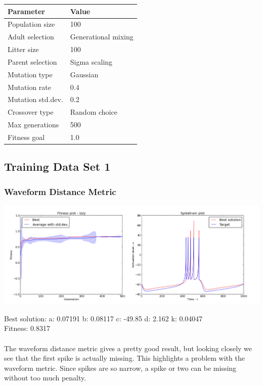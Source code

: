 \documentclass[a4paper,12pt]{article}
\begin{document}
\begin{tabular}{ll}
\hline
Parameter & Value \\
\hline \hline
Population size & 100 \\
Adult selection & Generational mixing \\
Litter size & 100 \\
Parent selection & Sigma scaling \\
Mutation type & Gaussian \\
Mutation rate & 0.4 \\
Mutation std.dev. & 0.2 \\
Crossover type & Random choice \\
Max generations & 500 \\
Fitness goal & 1.0 \\
\hline
\end{tabular}
\subsection{Training Data Set 1}
\subsubsection{Waveform Distance Metric}
\centerline{\includegraphics[width=1.2\textwidth]{img/case1_wave}}
Best solution: 
a: 0.07191 
b: 0.08117 
c: -49.85 
d: 2.162 
k: 0.04047 \\
Fitness: 0.8317
\paragraph{}The waveform distance metric gives a pretty good result, but looking closely we see that the first spike is actually missing. This highlights a problem with the waveform metric. Since spikes are so narrow, a spike or two can be missing without too much penalty.
\end{document}
